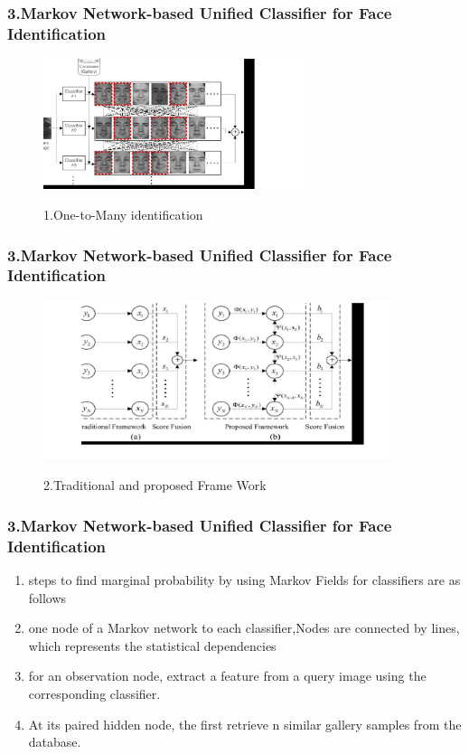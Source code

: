 \documentclass{beamer}
\begin{document}
\begin{frame}
\frametitle{\textbf{3.Markov Network-based Unified Classifier for Face Identification}}
\begin{figure}
  \includegraphics[width=3in]{face.pdf}\\
  \caption{1.One-to-Many identification }
\end{figure}
\end{frame}

\begin{frame}
\frametitle{\textbf{3.Markov Network-based Unified Classifier for Face Identification}}
\begin{figure}
  \includegraphics[width=4in]{classifier.pdf}\\
  \caption{2.Traditional and proposed Frame Work}
\end{figure}
\end{frame}

\begin{frame}
\frametitle{\textbf{3.Markov Network-based Unified Classifier for Face Identification}}
\begin{enumerate}
\item steps to find marginal probability by using Markov Fields for classifiers are as follows
\item one node of a Markov network to each classifier,Nodes are connected by lines, which represents the statistical dependencies
\item for an observation node,  extract a feature from a query image using the corresponding classifier.
\item At its paired hidden node, the first retrieve n similar gallery samples from the database.
\end{enumerate}
\end{frame}
\end{document}
